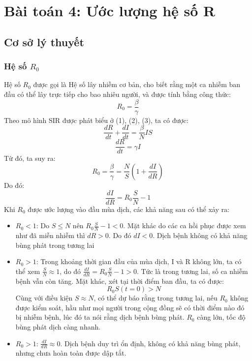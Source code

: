 \newpage
\section{Bài toán 4: Ước lượng hệ số R}
\subsection{Cơ sở lý thuyết}
\subsubsection{Hệ số $R_0$}
Hệ số $R_0$ được gọi là Hệ số lây nhiễm cơ bản, cho biết rằng một ca nhiễm ban đầu có thể lây trực tiếp cho bao nhiêu người, và được tính bằng công thức:
\[R_0 = \frac{\beta}{\gamma}\]
Theo mô hình SIR được phát biểu ở (1), (2), (3), ta có được:
\[\frac{dR}{dt} + \frac{dI}{dt} = \frac{\beta}{N}IS\]
\[\frac{dR}{dt} = \gamma I\]
Từ đó, ta suy ra: 
\[R_0 = \frac{\beta}{\gamma} = \frac{N}{S}(1 + \frac{dI}{dR})\] \label{R0_I_R}
Do đó:
\[\frac{dI}{dR} = R_0 \frac{S}{N} - 1\]
Khi $R_0$ được ước lượng vào đầu mùa dịch, các khả năng sau có thể xảy ra:
\begin{itemize}
    \item $R_0 < 1$: Do $S \leq N$ nên $R_0 \frac{S}{N} - 1 < 0$. Mặt khác do các ca hồi phục được xem như đã miễn nhiễm thì $dR > 0$. Do đó $dI < 0$. Dịch bệnh không có khả năng bùng phát trong tương lai
    \item $R_0 > 1$: Trong khoảng thời gian đầu của mùa dịch, I và R không lớn, ta có thể xem $\frac{S}{N} \approx 1$, do đó $\frac{dI}{dR} = R_0 \frac{S}{N} - 1 > 0$. Tức là trong tương lai, số ca nhiễm bệnh vẫn còn tăng.
    Mặt khác, xét tại thời điểm ban đầu, ta có được:
    $$R_0 S(t = 0) > N$$
    Cùng với điều kiện $S \approx N$, có thể dự báo rằng trong tương lai, nếu $R_0$ không được kiểm soát, hầu như mọi người trong cộng đồng sẽ có thời điểm nào đó bị nhiễm bệnh, lúc đó ta nói rằng dịch bệnh bùng phát. $R_0$ càng lớn, tốc độ bùng phát dịch càng nhanh.
    \item $R_0 > 1$: $\frac{dI}{dR} \approx 0$. Dịch bệnh duy trì ổn định, không có khả năng bùng phát, nhưng chưa hoàn toàn được dập tắt.
\end{itemize}

